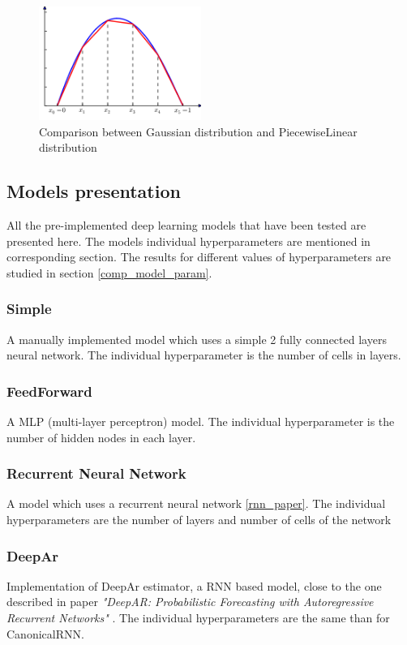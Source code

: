 \begin{figure}[H]
    \centering
    \includegraphics[width=200px]{220px-Finite_element_method_1D_illustration1.svg.png}
    \caption{Comparison between Gaussian distribution and PiecewiseLinear distribution}
    \label{fig:gausslaplace}
\end{figure}

\subsection{Models presentation} \label{diff_models}


All the pre-implemented deep learning models that have been tested  are presented here.
The models individual hyperparameters are mentioned in corresponding section.
The results for different values of hyperparameters are studied in section \ref{comp_model_param}.


\subsubsection{Simple} \label{descr_simple}
A manually implemented model which uses a simple 2 fully connected layers neural network.
The individual hyperparameter is the number of cells in layers.

\subsubsection{FeedForward} \label{descr_feedfordward}
A MLP (multi-layer perceptron) model.
The individual hyperparameter is the number of hidden nodes in each layer.

\subsubsection{Recurrent Neural Network} \label{descr_canonicalRNN}
A model which uses a recurrent neural network \ref{rnn_paper}.
The individual hyperparameters are the number of layers and number of cells of the network

\subsubsection{DeepAr} \label{descr_deepar}
Implementation of DeepAr estimator, a RNN based model, close to the one described in paper 
\textit{"DeepAR: Probabilistic Forecasting with Autoregressive Recurrent Networks"} \cite{deepar_paper}.
The individual hyperparameters are the same than for CanonicalRNN.

